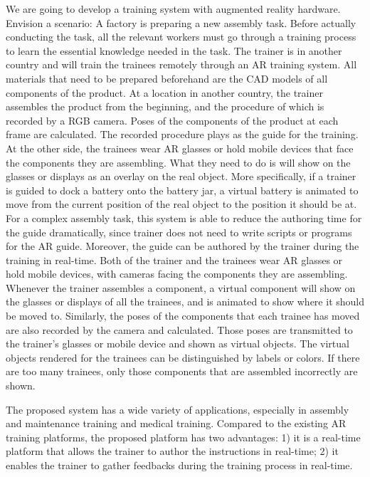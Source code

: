 We are going to develop a training system with augmented reality hardware.
Envision a scenario:
A factory is preparing a new assembly task.
Before actually conducting the task, all the relevant workers must go through a training process to learn the essential knowledge needed in the task.
The trainer is in another country and will train the trainees remotely through an AR training system.
All materials that need to be prepared beforehand are the CAD models of all components of the product.
At a location in another country, the trainer assembles the product from the beginning, and the procedure of which is recorded by a RGB camera. Poses of the components of the product at each frame are calculated. The recorded procedure plays as the guide for the training.
At the other side, the trainees wear AR glasses or hold mobile devices that face the components they are assembling. What they need to do is will show on the glasses or displays as an overlay on the real object. More specifically, if a trainer is guided to dock a battery onto the battery jar, a virtual battery is animated to move from the current position of the real object to the position it should be at.
For a complex assembly task, this system is able to reduce the authoring time for the guide dramatically, since trainer does not need to write scripts or programs for the AR guide.
Moreover, the guide can be authored by the trainer during the training in real-time.
Both of the trainer and the trainees wear AR glasses or hold mobile devices, with cameras facing the components they are assembling.
Whenever the trainer assembles a component, a virtual component will show on the glasses or displays of all the trainees, and is animated to show where it should be moved to.
Similarly, the poses of the components that each trainee has moved are also recorded by the camera and calculated.
Those poses are transmitted to the trainer's glasses or mobile device and shown as virtual objects.
The virtual objects rendered for the trainees can be distinguished by labels or colors. If there are too many trainees, only those components that are assembled incorrectly are shown.

The proposed system has a wide variety of applications, especially in assembly and maintenance training and medical training.
Compared to the existing AR training platforms, the proposed platform has two advantages: 1) it is a real-time platform that allows the trainer to author the instructions in real-time; 2) it enables the trainer to gather feedbacks during the training process in real-time.

